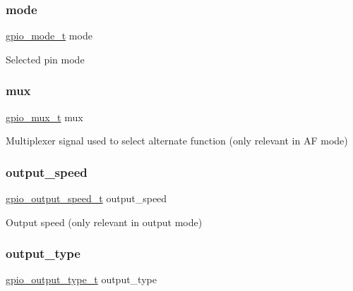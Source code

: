 \subsubsection{\texorpdfstring{mode}{mode}}
{\footnotesize\ttfamily \hyperlink{gpio__stm32f411__config_8h_a491a2cbfb4e94f2afcc0d5bdef2dc454}{gpio\+\_\+mode\+\_\+t} mode}

Selected pin mode \mbox{\label{structgpio__config__t_a517a0cd4125fcd45504b02d3c4a35d06}} 
\subsubsection{\texorpdfstring{mux}{mux}}
{\footnotesize\ttfamily \hyperlink{gpio__stm32f411__config_8h_ac86e130e5617ffe35f2aa1169d8a67c0}{gpio\+\_\+mux\+\_\+t} mux}

Multiplexer signal used to select alternate function (only relevant in AF mode) \mbox{\label{structgpio__config__t_ac73298500a7a55286292448e82fcbdbf}} 
\subsubsection{\texorpdfstring{output\+\_\+speed}{output\_speed}}
{\footnotesize\ttfamily \hyperlink{gpio__stm32f411__config_8h_aa8c7c905e73523d86cfed9bd45aa9495}{gpio\+\_\+output\+\_\+speed\+\_\+t} output\+\_\+speed}

Output speed (only relevant in output mode) \mbox{\label{structgpio__config__t_abebe3aee0015b70fbbbd12a796451b62}} 
\subsubsection{\texorpdfstring{output\+\_\+type}{output\_type}}
{\footnotesize\ttfamily \hyperlink{gpio__stm32f411__config_8h_a09cae9c54cabb67e47ab4c1200b341c6}{gpio\+\_\+output\+\_\+type\+\_\+t} output\+\_\+type}


